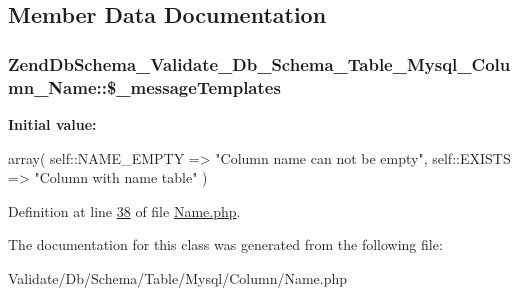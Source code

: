\subsection{\-Member \-Data \-Documentation}
\hypertarget{classZendDbSchema__Validate__Db__Schema__Table__Mysql__Column__Name_a31cbeca7f529cc62c9c306d6c5502998}{
\subsubsection[{\$\-\_\-message\-Templates}]{\setlength{\rightskip}{0pt plus 5cm}\-Zend\-Db\-Schema\-\_\-\-Validate\-\_\-\-Db\-\_\-\-Schema\-\_\-\-Table\-\_\-\-Mysql\-\_\-\-Column\-\_\-\-Name\-::\$\-\_\-message\-Templates}}\label{classZendDbSchema__Validate__Db__Schema__Table__Mysql__Column__Name_a31cbeca7f529cc62c9c306d6c5502998}
{\bfseries \-Initial value\-:}
\begin{DoxyCode}
 array(
        self::NAME\_EMPTY      => \textcolor{stringliteral}{"Column name can not be empty"},
        self::EXISTS          => \textcolor{stringliteral}{"Column with name %
       table"}
    )
\end{DoxyCode}


\-Definition at line \hyperlink{Table_2Mysql_2Column_2Name_8php_source_l00038}{38} of file \hyperlink{Table_2Mysql_2Column_2Name_8php_source}{\-Name.\-php}.



\-The documentation for this class was generated from the following file\-:\begin{DoxyCompactItemize}
\item 
\-Validate/\-Db/\-Schema/\-Table/\-Mysql/\-Column/\-Name.\-php\end{DoxyCompactItemize}
